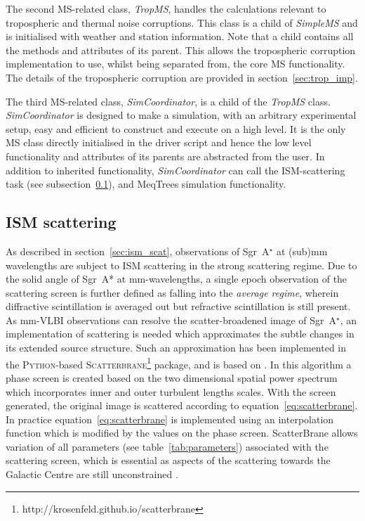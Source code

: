 The second MS-related class, \emph{TropMS}, handles the calculations relevant to tropospheric and thermal noise corruptions. This class is a child of {\it SimpleMS} and is initialised with weather and station information. Note that a child contains all the methods and attributes of its parent. This allows the tropospheric corruption implementation to use, whilst being separated from, the core MS functionality. The details of the tropospheric corruption are provided in section~\ref{sec:trop_imp}. 

The third MS-related class, \emph{SimCoordinator}, is a child of the {\it TropMS} class. {\it SimCoordinator} is designed to make a simulation, with an arbitrary experimental setup, easy and efficient to construct and execute on a high level. It is the only MS class directly initialised in the driver script and hence the low level functionality and attributes of its parents are abstracted from the user. In addition to inherited functionality, {\it SimCoordinator} can call the ISM-scattering task (see subsection~\ref{sec:ism_imp}), and {\sc MeqTrees} simulation functionality.
 

\subsection{ISM scattering}\label{sec:ism_imp}

As described in section~\ref{sec:ism_scat}, observations of Sgr~A$^\star$ at (sub)mm wavelengths are subject to ISM scattering in the strong scattering regime. Due to the solid angle of Sgr~A* at mm-wavelengths, a single epoch observation of the scattering screen is further defined as falling into the \emph{average regime}, wherein diffractive scintillation is averaged out but refractive scintillation is still present. As mm-VLBI observations can resolve the scatter-broadened image of Sgr~A$^\star$, an implementation of scattering is needed which approximates the subtle changes in its extended source structure. Such an approximation has been implemented in the \textsc{Python}-based \textsc{Scatterbrane}\footnote{http://krosenfeld.github.io/scatterbrane} package, and is based on \citet*{Johnson_2015a}. In this algorithm a phase screen is created based on the two dimensional spatial power spectrum  \citep*[see][Appendix C]{Johnson_2015a} which incorporates inner and outer turbulent lengths scales. With the screen generated, the original image is scattered according to equation~\ref{eq:scatterbrane}. In practice equation~\ref{eq:scatterbrane} is implemented using an interpolation function which is modified by the values on the phase screen. {\sc ScatterBrane} allows variation of all parameters (see table~\ref{tab:parameters}) associated with the scattering screen, which is essential as aspects of the scattering towards the Galactic Centre are still unconstrained \citep[e.g.][]{Gwinn_2014}.





